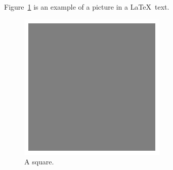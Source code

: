 \documentclass{article}
\begin{document}
Figure~\ref{fig:square} is an example of a picture in a \LaTeX\ text.

\begin{figure}[hbt]
    \begin{center}
        \includegraphics{p2.eps}
        \caption{A square.}
        \label{fig:square}
    \end{center}
\end{figure}
\end{document}
